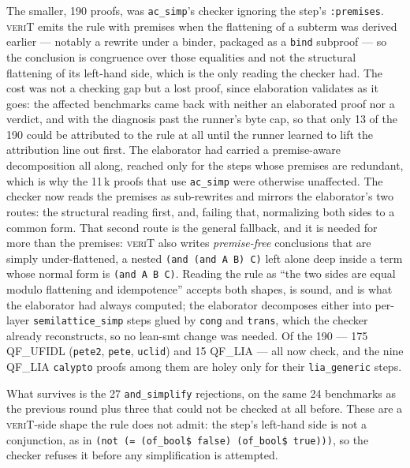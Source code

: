 \documentclass[runningheads]{llncs}
\newcommand{\verit}{\textsc{veriT}\xspace}
\newcommand{\rulename}[1]{\texttt{#1}}
\begin{document}
The smaller, 190 proofs, was \rulename{ac\_simp}'s checker ignoring the step's
\texttt{:premises}. \verit
emits the rule with premises when the flattening of a subterm was derived
earlier --- notably a rewrite under a binder, packaged as a \rulename{bind}
subproof --- so the conclusion is congruence over those equalities and not the
structural flattening of its left-hand side, which is the only reading the
checker had. The cost was not a checking gap but a lost proof, since
elaboration validates as it goes: the affected benchmarks came back with
neither an elaborated proof nor a verdict, and with the diagnosis past the
runner's byte cap, so that only 13 of the 190 could be attributed to the rule
at all until the runner learned to lift the attribution line out first. The elaborator had carried a
premise-aware decomposition all along, reached only for the steps whose
premises are redundant, which is why the 11\,k proofs that use
\rulename{ac\_simp} were otherwise unaffected. The checker now reads the
premises as sub-rewrites and mirrors the elaborator's two routes: the
structural reading first, and, failing that, normalizing both sides to a
common form. That second route is the general fallback, and it is needed for more than the premises: \verit
also writes \emph{premise-free} conclusions that are simply under-flattened,
a nested \texttt{(and (and A B) C)} left alone deep inside a term whose normal
form is \texttt{(and A B C)}. Reading the rule as ``the two sides are equal
modulo flattening and idempotence'' accepts both shapes, is sound, and is what
the elaborator had always computed; the elaborator decomposes either into
per-layer \rulename{semilattice\_simp} steps glued by \rulename{cong} and
\rulename{trans}, which the checker already reconstructs, so no lean-smt
change was needed. Of the 190 --- 175 QF\_UFIDL (\texttt{pete2},
\texttt{pete}, \texttt{uclid}) and 15 QF\_LIA --- all now check, and the nine
QF\_LIA \texttt{calypto} proofs among them are holey only for their
\rulename{lia\_generic} steps.

What survives is the 27 \rulename{and\_simplify} rejections, on the same 24
benchmarks as the previous round plus three that could not be checked at all
before. These are a \verit-side shape the rule does not admit: the step's
left-hand side is not a conjunction, as in \texttt{(not (= (of\_bool\$ false)
(of\_bool\$ true)))}, so the checker refuses it before any simplification is
attempted.
\end{document}
